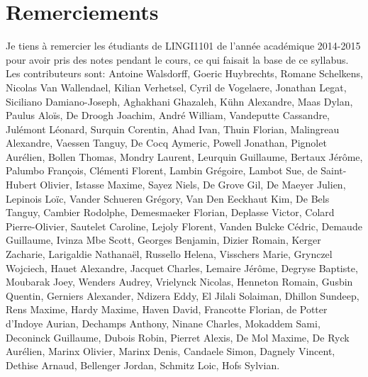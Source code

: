 \section*{Remerciements}

Je tiens à remercier les étudiants de LINGI1101 de l'année académique
2014-2015 pour avoir pris des
notes pendant le cours, ce qui faisait la base de ce syllabus.  Les
contributeurs sont:
Antoine Walsdorff,
Goeric Huybrechts,
Romane Schelkens,
Nicolas Van Wallendael, %
Kilian Verhetsel,
Cyril de Vogelaere,
Jonathan Legat, %
Siciliano Damiano-Joseph,
Aghakhani Ghazaleh,
Kühn Alexandre,
Maas Dylan, %
Paulus Aloïs,
De Droogh Joachim,
André William,
Vandeputte Cassandre, %
Julémont Léonard,
Surquin Corentin,
Ahad Ivan,
Thuin Florian, %
Malingreau Alexandre,
Vaessen Tanguy,
De Cocq Aymeric,
Powell Jonathan, %
Pignolet Aurélien,
Bollen Thomas,
Mondry Laurent,
Leurquin Guillaume, %
Bertaux Jérôme,
Palumbo François,
Clémenti Florent,
Lambin Grégoire, %
Lambot Sue,
de Saint-Hubert Olivier,
Istasse Maxime,
Sayez Niels, %
De Grove Gil,
De Maeyer Julien,
Lepinois Loïc,
Vander Schueren Grégory, %
Van Den Eeckhaut Kim,
De Bels Tanguy,
Cambier Rodolphe, %
Demesmaeker Florian, 
Deplasse Victor,
Colard Pierre-Olivier,
Sautelet Caroline, %
Lejoly Florent, 
Vanden Bulcke Cédric,
Demaude Guillaume,
Ivinza Mbe Scott, %
Georges Benjamin,
Dizier Romain,
Kerger Zacharie,
Larigaldie Nathanaël, %
Russello Helena,
Visschers Marie,
Grynczel Wojciech,
Hauet Alexandre, %
Jacquet Charles,
Lemaire Jérôme,
Degryse Baptiste,
Moubarak Joey,  %
Wenders Audrey,
Vrielynck Nicolas,
Henneton Romain,
Gusbin Quentin,  %
Gerniers Alexander,
Ndizera Eddy,
El Jilali Solaiman,
Dhillon Sundeep, %
Rens Maxime,
Hardy Maxime,
Haven David,
Francotte Florian, %
de Potter d'Indoye Aurian,
Dechamps Anthony,
Ninane Charles,
Mokaddem Sami,  %
Deconinck Guillaume,
Dubois Robin,
Pierret Alexis,
De Mol Maxime, %
De Ryck Aurélien,
Marinx Olivier,
Marinx Denis, %
Candaele Simon, 
Dagnely Vincent,
Dethise Arnaud,
Bellenger Jordan,
Schmitz Loic, %
Hofs Sylvian. %


